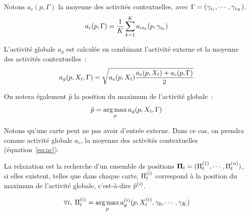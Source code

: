 \documentclass[../main]{subfiles}
\begin{document}
Notons $a_c(p, \Gamma)$ la moyenne des activités contextuelles, avec $\Gamma = (\gamma_{i_1}, \cdots, \gamma_{i_K})$.
\begin{equation}\label{eq:ac}
a_c(p, \Gamma) = \frac{1}{K}\sum_{k=1}^K {a_{ci_k}(p,\gamma_{i_k})}
\end{equation}

L'activité globale $a_g$ est calculée en combinant l'activité externe et la moyenne des activités contextuelles~:
\begin{equation}
\label{eq:global_act}
a_g(p, X_t,\Gamma) = \sqrt{a_e(p, X_t) \frac{a_e(p, X_t) +  a_c(p, \Gamma)}{2}}
\end{equation}

On notera également $\hat{p}$ la position du maximum de l'activité globale~:
\begin{equation}
\label{argmax}
\hat{p} = \operatorname*{arg\,max}\limits_p a_g(p, X_t, \Gamma)
\end{equation}

Notons qu'une carte peut ne pas avoir d'entrée externe. Dans ce cas, on prendra comme activité globale $a_c$, la moyenne des activités contextuelles (équation~\ref{eq:ac}).

La relaxation est la recherche d'un ensemble de positions $\mathbf{\Pi}_t = (\Pi^{({1})}_t, \cdots, \Pi^{({n})}_t)$, si elles existent, telles que dans chaque carte, $\Pi^{({i})}_t$ correspond à la position du maximum de l'activité globale, c'est-à-dire $\hat{p}^{({i})}$.

\begin{equation}
\forall i, \; \Pi^{({i})}_t = \operatorname*{arg\,max}\limits_p a_g^{({i})}(p, X^{({i})}_t, \gamma_0, \cdots, \gamma_K)
\end{equation}
\end{document}
